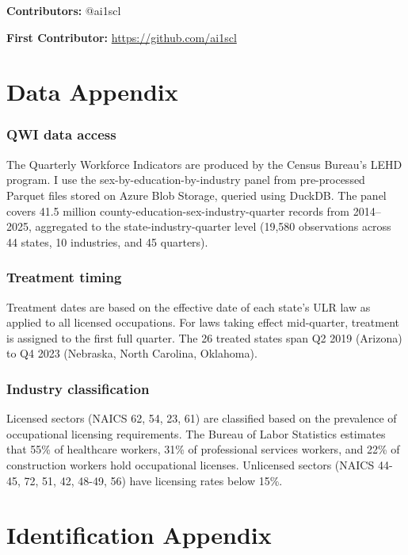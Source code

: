 \documentclass[12pt]{article}
\begin{document}
\noindent\textbf{Contributors:} @ai1scl

\noindent\textbf{First Contributor:} \url{https://github.com/ai1scl}

\label{apep_main_text_end}
\newpage


\newpage
\appendix

\section{Data Appendix}

\subsubsection*{QWI data access} The Quarterly Workforce Indicators are produced by the Census Bureau's LEHD program. I use the sex-by-education-by-industry panel from pre-processed Parquet files stored on Azure Blob Storage, queried using DuckDB. The panel covers 41.5 million county-education-sex-industry-quarter records from 2014--2025, aggregated to the state-industry-quarter level (19,580 observations across 44 states, 10 industries, and 45 quarters).

\subsubsection*{Treatment timing} Treatment dates are based on the effective date of each state's ULR law as applied to all licensed occupations. For laws taking effect mid-quarter, treatment is assigned to the first full quarter. The 26 treated states span Q2 2019 (Arizona) to Q4 2023 (Nebraska, North Carolina, Oklahoma).

\subsubsection*{Industry classification} Licensed sectors (NAICS 62, 54, 23, 61) are classified based on the prevalence of occupational licensing requirements. The Bureau of Labor Statistics estimates that 55\% of healthcare workers, 31\% of professional services workers, and 22\% of construction workers hold occupational licenses. Unlicensed sectors (NAICS 44-45, 72, 51, 42, 48-49, 56) have licensing rates below 15\%.

\section{Identification Appendix}
\end{document}
